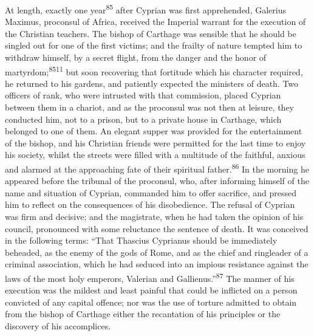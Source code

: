 At length, exactly one year\textsuperscript{85} after Cyprian was first
apprehended, Galerius Maximus, proconsul of Africa, received the
Imperial warrant for the execution of the Christian teachers. The
bishop of Carthage was sensible that he should be singled out for
one of the first victims; and the frailty of nature tempted him
to withdraw himself, by a secret flight, from the danger and the
honor of martyrdom;\textsuperscript{8511} but soon recovering that fortitude which
his character required, he returned to his gardens, and patiently
expected the ministers of death. Two officers of rank, who were
intrusted with that commission, placed Cyprian between them in a
chariot, and as the proconsul was not then at leisure, they
conducted him, not to a prison, but to a private house in
Carthage, which belonged to one of them. An elegant supper was
provided for the entertainment of the bishop, and his Christian
friends were permitted for the last time to enjoy his society,
whilst the streets were filled with a multitude of the faithful,
anxious and alarmed at the approaching fate of their spiritual
father.\textsuperscript{86} In the morning he appeared before the tribunal of the
proconsul, who, after informing himself of the name and situation
of Cyprian, commanded him to offer sacrifice, and pressed him to
reflect on the consequences of his disobedience. The refusal of
Cyprian was firm and decisive; and the magistrate, when he had
taken the opinion of his council, pronounced with some reluctance
the sentence of death. It was conceived in the following terms:
“That Thascius Cyprianus should be immediately beheaded, as the
enemy of the gods of Rome, and as the chief and ringleader of a
criminal association, which he had seduced into an impious
resistance against the laws of the most holy emperors, Valerian
and Gallienus.”\textsuperscript{87} The manner of his execution was the mildest
and least painful that could be inflicted on a person convicted
of any capital offence; nor was the use of torture admitted to
obtain from the bishop of Carthage either the recantation of his
principles or the discovery of his accomplices.



